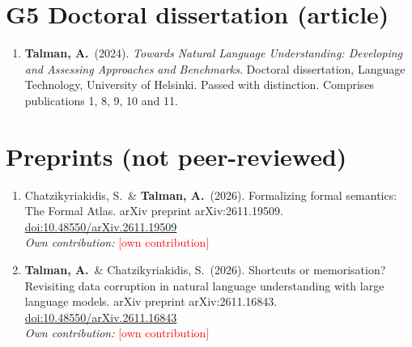 \documentclass[12pt,a4paper]{article}
\newcommand{\fillin}[1]{\textcolor{red}{[#1]}}
\newcommand{\me}{\textbf{Talman, A.}}
\newcommand{\contrib}[1]{\\\textit{Own contribution:} #1}
\begin{document}
\section{G5 Doctoral dissertation (article)}
\begin{enumerate}[resume*=pubs]
  \item \me\ (2024). \emph{Towards Natural Language Understanding: Developing and Assessing Approaches and Benchmarks}. Doctoral dissertation, Language Technology, University of Helsinki. Passed with distinction. Comprises publications 1, 8, 9, 10 and 11.
\end{enumerate}

\section{Preprints (not peer-reviewed)}
\begin{enumerate}[label=P\arabic*.]
  \item Chatzikyriakidis, S.\ \& \me\ (2026). Formalizing formal semantics: The Formal Atlas. arXiv preprint arXiv:2611.19509. \href{https://doi.org/10.48550/arXiv.2611.19509}{doi:10.48550/arXiv.2611.19509}
  \contrib{\fillin{own contribution}}

  \item \me\ \& Chatzikyriakidis, S.\ (2026). Shortcuts or memorisation? Revisiting data corruption in natural language understanding with large language models. arXiv preprint arXiv:2611.16843. \href{https://doi.org/10.48550/arXiv.2611.16843}{doi:10.48550/arXiv.2611.16843}
  \contrib{\fillin{own contribution}}
\end{enumerate}
\end{document}
